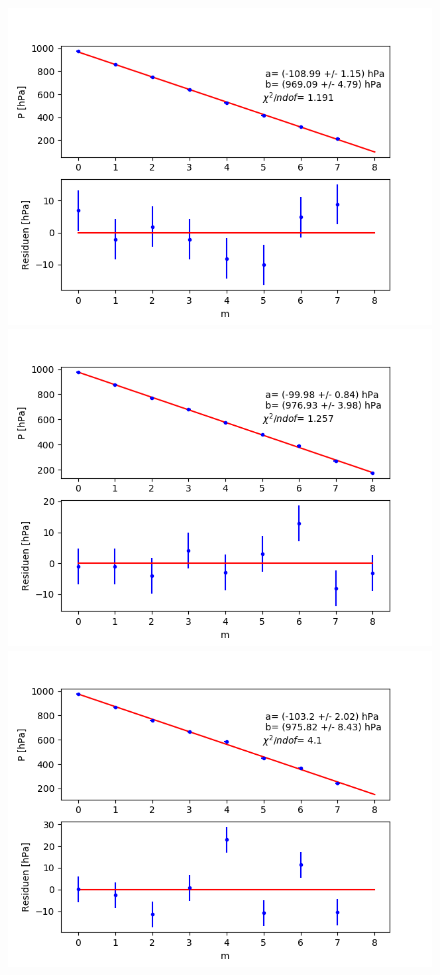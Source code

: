 \documentclass[12pt,a4paper]{article}
\begin{document}
\begin{figure}
\includegraphics[scale=0.5]{Bilder/Druck_B_Var2_3.png}
\includegraphics[scale=0.5]{Bilder/Druck_B_Var2_4.png}
\includegraphics[scale=0.5]{Bilder/Druck_B_Var2_5.png}

\end{figure}
\end{document}
